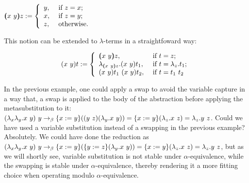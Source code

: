 $\vswap{x}{y}{z} := \left\{ \begin{array}{ll}
y, & \mbox{ if } z = x; \\
x, & \mbox{ if } z = y; \\
z, & \mbox{ otherwise. } \\
\end{array}\right.$


This notion can be extended to $\lambda$-terms in a straightfoward way:


\begin{equation}\label{def:swap}
\swap{x}{y}{t} := \left\{ \begin{array}{ll}
\vswap{x}{y}{z}, & \mbox{ if } t = z; \\
\lambda_{\vswap{x}{y}{z}}.\swap{x}{y}{t_1}, & \mbox{ if } t = \lambda_z.t_1; \\
\swap{x}{y}{t_1}\ \swap{x}{y}{t_2}, & \mbox{ if } t = t_1\ t_2\\
\end{array}\right.
\end{equation}


In the previous example, one could apply a swap to avoid the variable capture in a way that, a swap is applied to the body of the abstraction before applying the metasubstitution to it: $(\lambda_x\lambda_y.x\ y)\ y \to_{\beta} \metasub{(\swap{y}{z}{(\lambda_y.x\ y)})}{x}{y} = \metasub{(\lambda_z.x\ z)}{x}{y} = \lambda_z.y\ z$. Could we have used a variable substitution instead of a swapping in the previous example? Absolutely. We could have done the reduction as $(\lambda_x\lambda_y.x\ y)\ y \to_{\beta} \metasub{(\metasub{(\lambda_y.x\ y)}{y}{z})}{x}{y} = \metasub{(\lambda_z.x\ z)}{x}{y} = \lambda_z.y\ z$, but as we will shortly see, variable substitution is not stable under $\alpha$-equivalence, while the swapping is stable under $\alpha$-equivalence, thereby rendering it a more fitting choice when operating modulo $\alpha$-equivalence.


